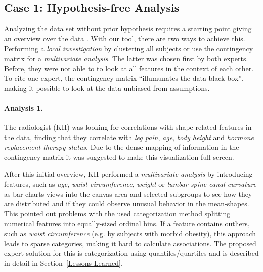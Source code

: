 \documentclass[journal]{style/vgtc} 			          %
\begin{document}
\subsection{Case 1: Hypothesis-free Analysis} \label{Hypothesis-free analysis}
Analyzing the data set without prior hypothesis requires a starting point giving an overview over the data \cite{Shneiderman1996}.
%
With our tool, there are two ways to achieve this.
%
Performing a \emph{local investigation} by clustering all subjects or use the contingency matrix for a \emph{multivariate analysis}.
%
The latter was chosen first by both experts.
%
Before, they were not able to to look at all features in the context of each other.
%
%
To cite one expert, the contingency matrix ``illumunates the data black box'', making it possible to look at the data unbiased from assumptions.

\paragraph{Analysis 1.}
%
The radiologist (KH) was looking for correlations with shape-related features in the data, finding that they correlate with \emph{leg pain}, \emph{age}, \emph{body height} and \emph{hormone replacement therapy status}.
%
Due to the dense mapping of information in the contingency matrix it was suggested to make this visualization full screen.

After this initial overview, KH performed a \emph{multivariate analysis} by introducing features, such as \emph{age}, \emph{waist circumference}, \emph{weight} or \emph{lumbar spine canal curvature} as bar charts views into the canvas area and selected subgroups to see how they are distributed and if they could observe unusual behavior in the mean-shapes.
%
This pointed out problems with the used categorization method splitting numerical features into equally-sized ordinal bins.
%
If a feature contains outliers, such as \emph{waist circumference} (e.g. by subjects with morbid obesity), this approach leads to sparse categories, making it hard to calculate associations.
%
The proposed expert solution for this is categorization using quantiles/quartiles and is described in detail in Section~\ref{Lessons Learned}.
\end{document}
